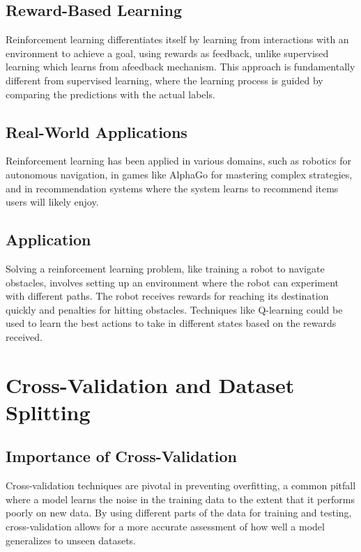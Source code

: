 \documentclass[11pt, a4paper]{article}
\begin{document}
\subsection{Reward-Based Learning}
Reinforcement learning differentiates itself by learning from interactions with an environment to achieve a goal, using rewards as feedback, unlike supervised learning which learns from afeedback mechanism. This approach is fundamentally different from supervised learning, where the learning process is guided by comparing the predictions with the actual labels.

\subsection{Real-World Applications}
Reinforcement learning has been applied in various domains, such as robotics for autonomous navigation, in games like AlphaGo for mastering complex strategies, and in recommendation systems where the system learns to recommend items users will likely enjoy.

\subsection{Application}
Solving a reinforcement learning problem, like training a robot to navigate obstacles, involves setting up an environment where the robot can experiment with different paths. The robot receives rewards for reaching its destination quickly and penalties for hitting obstacles. Techniques like Q-learning could be used to learn the best actions to take in different states based on the rewards received.

\section{Cross-Validation and Dataset Splitting}

\subsection{Importance of Cross-Validation}
Cross-validation techniques are pivotal in preventing overfitting, a common pitfall where a model learns the noise in the training data to the extent that it performs poorly on new data. By using different parts of the data for training and testing, cross-validation allows for a more accurate assessment of how well a model generalizes to unseen datasets.
\end{document}
